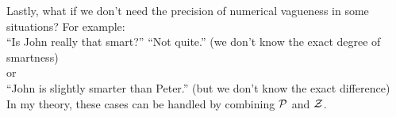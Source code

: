 Lastly, what if we don't need the precision of numerical vagueness in some situations?  For example:\\
\hspace*{1cm} ``Is John really that smart?'' ``Not quite.'' (we don't know the exact degree of smartness)\\
or\\
\hspace*{1cm} ``John is slightly smarter than Peter.'' (but we don't know the exact difference)\\
In my theory, these cases can be handled by combining $\mathcal{P}$ and $\mathcal{Z}$.



